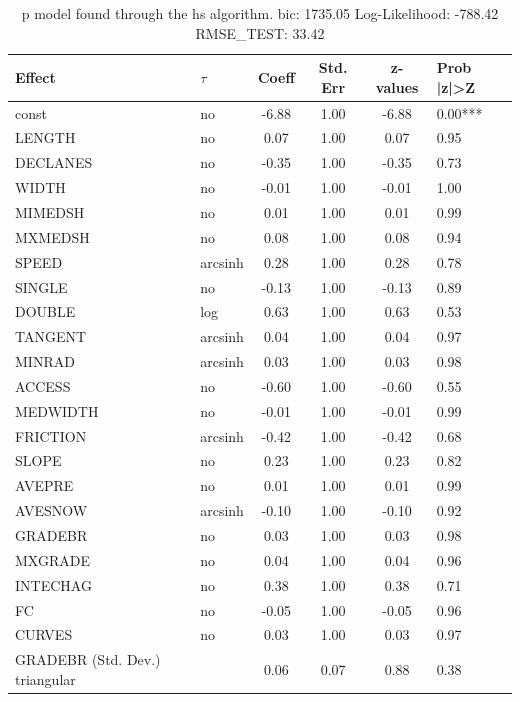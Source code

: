 \begin{table}
	\caption{p model found through the hs algorithm. bic: 1735.05 Log-Likelihood: -788.42 RMSE_TEST: 33.42}
	\begin{center}
		\begin{tabular}{|l|l|c|c|c|l|}
			\hline
			Effect & $\tau$ & Coeff & Std. Err & z-values & Prob |z|>Z \\
			\hline
			const & no & -6.88 & 1.00 & -6.88 & 0.00*** \\
			\hline
			LENGTH & no & 0.07 & 1.00 & 0.07 & 0.95 \\
			\hline
			DECLANES & no & -0.35 & 1.00 & -0.35 & 0.73 \\
			\hline
			WIDTH & no & -0.01 & 1.00 & -0.01 & 1.00 \\
			\hline
			MIMEDSH & no & 0.01 & 1.00 & 0.01 & 0.99 \\
			\hline
			MXMEDSH & no & 0.08 & 1.00 & 0.08 & 0.94 \\
			\hline
			SPEED & arcsinh & 0.28 & 1.00 & 0.28 & 0.78 \\
			\hline
			SINGLE & no & -0.13 & 1.00 & -0.13 & 0.89 \\
			\hline
			DOUBLE & log & 0.63 & 1.00 & 0.63 & 0.53 \\
			\hline
			TANGENT & arcsinh & 0.04 & 1.00 & 0.04 & 0.97 \\
			\hline
			MINRAD & arcsinh & 0.03 & 1.00 & 0.03 & 0.98 \\
			\hline
			ACCESS & no & -0.60 & 1.00 & -0.60 & 0.55 \\
			\hline
			MEDWIDTH & no & -0.01 & 1.00 & -0.01 & 0.99 \\
			\hline
			FRICTION & arcsinh & -0.42 & 1.00 & -0.42 & 0.68 \\
			\hline
			SLOPE & no & 0.23 & 1.00 & 0.23 & 0.82 \\
			\hline
			AVEPRE & no & 0.01 & 1.00 & 0.01 & 0.99 \\
			\hline
			AVESNOW & arcsinh & -0.10 & 1.00 & -0.10 & 0.92 \\
			\hline
			GRADEBR & no & 0.03 & 1.00 & 0.03 & 0.98 \\
			\hline
			MXGRADE & no & 0.04 & 1.00 & 0.04 & 0.96 \\
			\hline
			INTECHAG & no & 0.38 & 1.00 & 0.38 & 0.71 \\
			\hline
			FC & no & -0.05 & 1.00 & -0.05 & 0.96 \\
			\hline
			CURVES & no & 0.03 & 1.00 & 0.03 & 0.97 \\
			\hline
			GRADEBR (Std. Dev.) triangular &  & 0.06 & 0.07 & 0.88 & 0.38 \\

\end{tabular}
\end{center}
\end{table}
